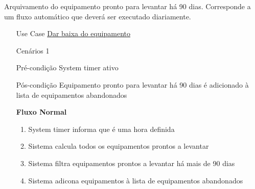 \documentclass[../relatorio.tex]{subfiles}
\begin{document}
Arquivamento do equipamento pronto para levantar há 90 dias.
Corresponde a um fluxo automático que deverá ser executado diariamente.
\begin{itemize}
    \item[Use Case] {\underline{Dar baixa do equipamento}}
    \item[Cenários] {1}
    \item[Pré-condição] {System timer ativo}
    \item[Pós-condição] {Equipamento pronto para levantar há 90 dias é adicionado à lista de equipamentos abandonados}
          \begin{flushleft}
              \textbf{Fluxo Normal}
          \end{flushleft}
          \begin{enumerate}
              \item System timer informa que é uma hora definida
              \item Sistema calcula todos os equipamentos prontos a levantar
              \item Sistema filtra equipamentos prontos a levantar há mais de 90 dias
              \item Sistema adicona equipamentos à lista de equipamentos abandonados
          \end{enumerate}
\end{itemize}
\end{document}
